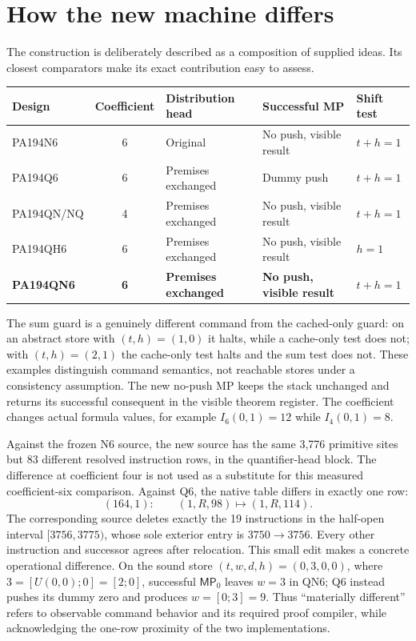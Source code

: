 \documentclass[11pt,letterpaper]{article}
\begin{document}
\section{How the new machine differs}
\label{sec:difference}

The construction is deliberately described as a composition of supplied
ideas. Its closest comparators make its exact contribution easy to assess.
\begin{center}\small
\begin{tabular}{@{}lclll@{}}
\toprule Design &Coefficient& Distribution head & Successful MP & Shift test\\\midrule
PA194N6 &6& Original & No push, visible result &$t+h=1$\\
PA194Q6 &6& Premises exchanged & Dummy push &$t+h=1$\\
PA194QN/NQ &4& Premises exchanged & No push, visible result &$t+h=1$\\
PA194QH6 &6& Premises exchanged & No push, visible result &$h=1$\\
\textbf{PA194QN6} &\textbf{6}&\textbf{Premises exchanged}&\textbf{No push, visible result}&\boldmath$t+h=1$\\
\bottomrule
\end{tabular}
\end{center}

The sum guard is a genuinely different command from the cached-only guard:
on an abstract store with $(t,h)=(1,0)$ it halts, while a cache-only test
does not; with $(t,h)=(2,1)$ the cache-only test halts and the sum test does
not. These examples distinguish command semantics, not reachable stores
under a consistency assumption. The new no-push MP keeps the stack unchanged
and returns its successful consequent in the visible theorem register.
The coefficient changes actual formula values, for example
$I_6(0,1)=12$ while $I_4(0,1)=8$.

Against the frozen N6 source, the new source has the same 3,776 primitive
sites but 83 different resolved instruction rows, in the quantifier-head
block. The difference at coefficient four is not used as a substitute for
this measured coefficient-six comparison. Against Q6, the native table
differs in exactly one row:
\[
 (164,1):\qquad (1,R,98)\longmapsto(1,R,114).
\]
The corresponding source deletes exactly the 19 instructions in the
half-open interval $[3756,3775)$, whose sole exterior entry is
$3750\to3756$. Every other instruction and successor agrees after relocation.
This small edit makes a concrete operational difference. On the sound store
$(t,w,d,h)=(0,3,0,0)$, where $3=[U(0,0);0]=[2;0]$, successful
$\mathsf{MP}_0$ leaves $w=3$ in QN6; Q6 instead pushes its dummy zero and
produces $w=[0;3]=9$. Thus ``materially different'' refers to observable
command behavior and its required proof compiler, while acknowledging the
one-row proximity of the two implementations.
\end{document}
